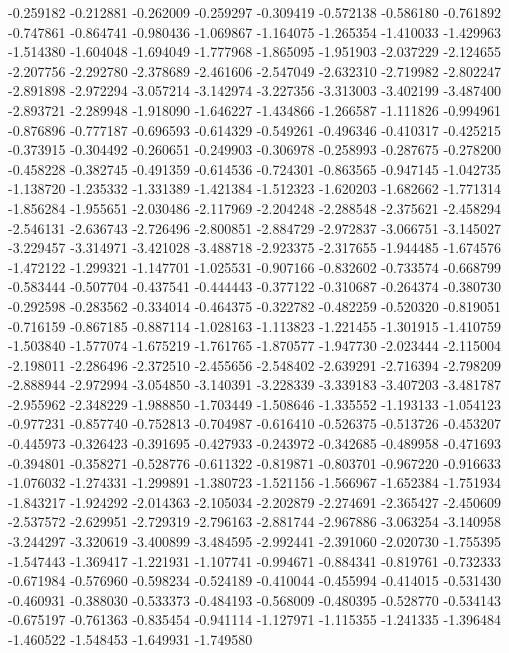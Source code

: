 -0.259182
-0.212881
-0.262009
-0.259297
-0.309419
-0.572138
-0.586180
-0.761892
-0.747861
-0.864741
-0.980436
-1.069867
-1.164075
-1.265354
-1.410033
-1.429963
-1.514380
-1.604048
-1.694049
-1.777968
-1.865095
-1.951903
-2.037229
-2.124655
-2.207756
-2.292780
-2.378689
-2.461606
-2.547049
-2.632310
-2.719982
-2.802247
-2.891898
-2.972294
-3.057214
-3.142974
-3.227356
-3.313003
-3.402199
-3.487400
-2.893721
-2.289948
-1.918090
-1.646227
-1.434866
-1.266587
-1.111826
-0.994961
-0.876896
-0.777187
-0.696593
-0.614329
-0.549261
-0.496346
-0.410317
-0.425215
-0.373915
-0.304492
-0.260651
-0.249903
-0.306978
-0.258993
-0.287675
-0.278200
-0.458228
-0.382745
-0.491359
-0.614536
-0.724301
-0.863565
-0.947145
-1.042735
-1.138720
-1.235332
-1.331389
-1.421384
-1.512323
-1.620203
-1.682662
-1.771314
-1.856284
-1.955651
-2.030486
-2.117969
-2.204248
-2.288548
-2.375621
-2.458294
-2.546131
-2.636743
-2.726496
-2.800851
-2.884729
-2.972837
-3.066751
-3.145027
-3.229457
-3.314971
-3.421028
-3.488718
-2.923375
-2.317655
-1.944485
-1.674576
-1.472122
-1.299321
-1.147701
-1.025531
-0.907166
-0.832602
-0.733574
-0.668799
-0.583444
-0.507704
-0.437541
-0.444443
-0.377122
-0.310687
-0.264374
-0.380730
-0.292598
-0.283562
-0.334014
-0.464375
-0.322782
-0.482259
-0.520320
-0.819051
-0.716159
-0.867185
-0.887114
-1.028163
-1.113823
-1.221455
-1.301915
-1.410759
-1.503840
-1.577074
-1.675219
-1.761765
-1.870577
-1.947730
-2.023444
-2.115004
-2.198011
-2.286496
-2.372510
-2.455656
-2.548402
-2.639291
-2.716394
-2.798209
-2.888944
-2.972994
-3.054850
-3.140391
-3.228339
-3.339183
-3.407203
-3.481787
-2.955962
-2.348229
-1.988850
-1.703449
-1.508646
-1.335552
-1.193133
-1.054123
-0.977231
-0.857740
-0.752813
-0.704987
-0.616410
-0.526375
-0.513726
-0.453207
-0.445973
-0.326423
-0.391695
-0.427933
-0.243972
-0.342685
-0.489958
-0.471693
-0.394801
-0.358271
-0.528776
-0.611322
-0.819871
-0.803701
-0.967220
-0.916633
-1.076032
-1.274331
-1.299891
-1.380723
-1.521156
-1.566967
-1.652384
-1.751934
-1.843217
-1.924292
-2.014363
-2.105034
-2.202879
-2.274691
-2.365427
-2.450609
-2.537572
-2.629951
-2.729319
-2.796163
-2.881744
-2.967886
-3.063254
-3.140958
-3.244297
-3.320619
-3.400899
-3.484595
-2.992441
-2.391060
-2.020730
-1.755395
-1.547443
-1.369417
-1.221931
-1.107741
-0.994671
-0.884341
-0.819761
-0.732333
-0.671984
-0.576960
-0.598234
-0.524189
-0.410044
-0.455994
-0.414015
-0.531430
-0.460931
-0.388030
-0.533373
-0.484193
-0.568009
-0.480395
-0.528770
-0.534143
-0.675197
-0.761363
-0.835454
-0.941114
-1.127971
-1.115355
-1.241335
-1.396484
-1.460522
-1.548453
-1.649931
-1.749580
